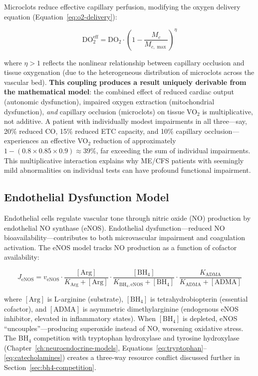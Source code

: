 Microclots reduce effective capillary perfusion, modifying the oxygen delivery equation (Equation~\ref{eq:o2-delivery}):

\begin{equation}
\label{eq:o2-microclot}
\text{DO}_{2}^{\text{eff}} = \text{DO}_2 \cdot \left(1 - \frac{M_c}{M_{c,\max}}\right)^{\eta}
\end{equation}

where $\eta > 1$ reflects the nonlinear relationship between capillary occlusion and tissue oxygenation (due to the heterogeneous distribution of microclots across the vascular bed). \textbf{This coupling produces a result uniquely derivable from the mathematical model}: the combined effect of reduced cardiac output (autonomic dysfunction), impaired oxygen extraction (mitochondrial dysfunction), \emph{and} capillary occlusion (microclots) on tissue VO$_2$ is multiplicative, not additive. A patient with individually modest impairments in all three---say, 20\% reduced CO, 15\% reduced ETC capacity, and 10\% capillary occlusion---experiences an effective VO$_2$ reduction of approximately $1 - (0.8 \times 0.85 \times 0.9) \approx 39\%$, far exceeding the sum of individual impairments. This multiplicative interaction explains why ME/CFS patients with seemingly mild abnormalities on individual tests can have profound functional impairment.

\subsection{Endothelial Dysfunction Model}

Endothelial cells regulate vascular tone through nitric oxide (NO) production by endothelial NO synthase (eNOS). Endothelial dysfunction---reduced NO bioavailability---contributes to both microvascular impairment and coagulation activation. The eNOS model tracks NO production as a function of cofactor availability:

\begin{equation}
\label{eq:enos-model}
J_{\text{eNOS}} = v_{\text{eNOS}} \cdot \frac{[\text{Arg}]}{K_{\text{Arg}} + [\text{Arg}]} \cdot \frac{[\text{BH}_4]}{K_{\text{BH}_4,\text{eNOS}} + [\text{BH}_4]} \cdot \frac{K_{\text{ADMA}}}{K_{\text{ADMA}} + [\text{ADMA}]}
\end{equation}

where $[\text{Arg}]$ is L-arginine (substrate), $[\text{BH}_4]$ is tetrahydrobiopterin (essential cofactor), and $[\text{ADMA}]$ is asymmetric dimethylarginine (endogenous eNOS inhibitor, elevated in inflammatory states). When $[\text{BH}_4]$ is depleted, eNOS ``uncouples''---producing superoxide instead of NO, worsening oxidative stress. The BH$_4$ competition with tryptophan hydroxylase and tyrosine hydroxylase (Chapter~\ref{ch:neuroendocrine-models}, Equations~\ref{eq:tryptophan}--\ref{eq:catecholamines}) creates a three-way resource conflict discussed further in Section~\ref{sec:bh4-competition}.

